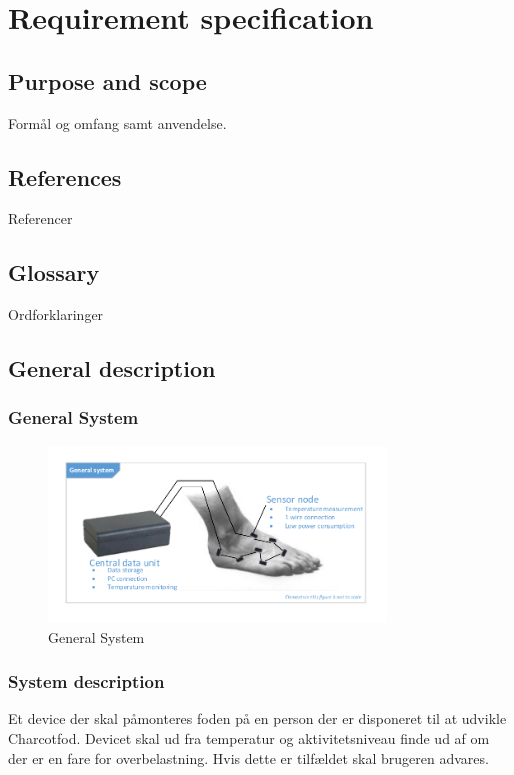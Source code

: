 \chapter{Requirement specification}
\section{Purpose and scope}
Formål og omfang samt anvendelse.
\section{References}
Referencer
\section{Glossary}
Ordforklaringer
\section{General description}
\subsection{General System}
\begin{figure}[H]
	\centering
	\includegraphics[width=0.8\textwidth]{billeder/GeneralSystem}
	\caption{General System}
\end{figure}

\subsection{System description}
Et device der skal påmonteres foden på en person der er disponeret til at udvikle Charcotfod. Devicet skal ud fra temperatur og aktivitetsniveau finde ud af om der er en fare for overbelastning. Hvis dette er tilfældet skal brugeren advares.


